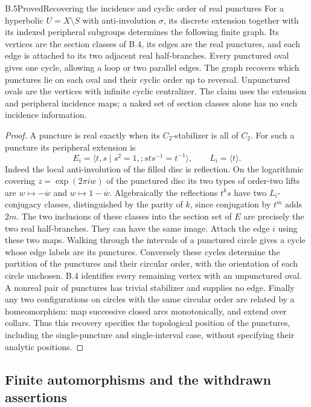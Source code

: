 \begin{claim}{B.5}{Proved}{Recovering the incidence and cyclic order of real punctures}
For a hyperbolic $U=X\setminus S$ with anti-involution $\sigma$, its discrete
extension together with its indexed peripheral subgroups determines the following
finite graph. Its vertices are the section classes of B.4, its edges are the real
punctures, and each edge is attached to its two adjacent real half-branches.
Every punctured oval gives one cycle, allowing a loop or two parallel edges.
The graph recovers which punctures lie on each oval and their cyclic order up
to reversal. Unpunctured ovals are the vertices with infinite cyclic centralizer.
The claim uses the extension and peripheral incidence maps; a naked set of
section classes alone has no such incidence information.
\end{claim}
\begin{proof}
A puncture is real exactly when its $C_2$-stabilizer is all of $C_2$. For such a
puncture its peripheral extension is
\[
 E_i=\langle t,s\mid s^2=1,;sts^{-1}=t^{-1}\rangle,
 \qquad L_i=\langle t\rangle.
\]
Indeed the local anti-involution of the filled disc is reflection. On the
logarithmic covering $z=\exp(2\pi i w)$ of the punctured disc its two types of
order-two lifts are $w\mapsto-\overline w$ and
$w\mapsto1-\overline w$. Algebraically the reflections $t^k s$ have two
$L_i$-conjugacy classes, distinguished by the parity of $k$, since conjugation
by $t^m$ adds $2m$. The two inclusions of these classes into the section set of
$E$ are precisely the two real half-branches. They can have the same image.
Attach the edge $i$ using these two maps. Walking through the intervals of a
punctured circle gives a cycle whose edge labels are its punctures. Conversely
these cycles determine the partition of the punctures and their circular order,
with the orientation of each circle unchosen. B.4 identifies every remaining
vertex with an unpunctured oval. A nonreal pair of punctures has trivial
stabilizer and supplies no edge. Finally any two configurations on circles with
the same circular order are related by a homeomorphism: map successive closed
arcs monotonically, and extend over collars. Thus this recovery specifies the
topological position of the punctures, including the single-puncture and
single-interval case, without specifying their analytic positions.
\end{proof}

\subsection{Finite automorphisms and the withdrawn assertions}

